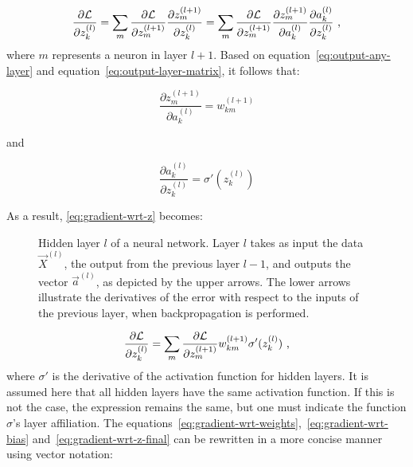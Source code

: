 \begin{equation}
\label{eq:gradient-wrt-z}
\frac{\partial \mathcal{L}}{\partial z_{k}^{(l)}} = \sum_{m} \frac{\partial \mathcal{L}}{\partial z_{m}^{(l+1)}}\frac{\partial z_{m}^{(l+1)}}{\partial z_{k}^{(l)}} = \sum_{m} \frac{\partial \mathcal{L}}{\partial z_{m}^{(l+1)}}\frac{\partial z_{m}^{(l+1)}}{\partial a_{k}^{(l)}}\frac{\partial a_{k}^{(l)}}{\partial z_{k}^{(l)}}\text{ ,}
\end{equation}
where $m$ represents a neuron in layer $l+1$. Based on equation~\eqref{eq:output-any-layer} and equation~\eqref{eq:output-layer-matrix}, it follows that:

\begin{equation*}
\frac{\partial z_{m}^{(l+1)}}{\partial a_{k}^{(l)}} = w_{km}^{(l+1)}
\end{equation*}

and

\begin{equation*}
\frac{\partial a_{k}^{(l)}}{\partial z_{k}^{(l)}} = \sigma'(z_{k}^{(l)})
\end{equation*}

As a result, \eqref{eq:gradient-wrt-z} becomes:

\begin{figure}
    \centering
    \caption{Hidden layer $l$ of a neural network. Layer $l$ takes as input the data $\Vec{X}^{(l)}$, the output from the previous layer $l-1$, and outputs the vector $\Vec{a}^{(l)}$, as depicted by the upper arrows. The lower arrows illustrate the derivatives of the error with respect to the inputs of the previous layer, when backpropagation is performed.}
    \label{fig:illustration-layer-l}
\end{figure}

\begin{equation}
\label{eq:gradient-wrt-z-final}
\frac{\partial \mathcal{L}}{\partial z_{k}^{(l)}} = \sum_{m} \frac{\partial \mathcal{L}}{\partial z_{m}^{(l+1)}}w_{km}^{(l+1)}\sigma'(z_{k}^{(l)}) \text{ ,}
\end{equation}
where $\sigma'$ is the derivative of the activation function for hidden layers. It is assumed here that all hidden layers have the same activation function. If this is not the case, the expression remains the same, but one must indicate the function $\sigma$'s layer affiliation. The equations~\eqref{eq:gradient-wrt-weights},~\eqref{eq:gradient-wrt-bias} and~\eqref{eq:gradient-wrt-z-final} can be rewritten in a more concise manner using vector notation:

